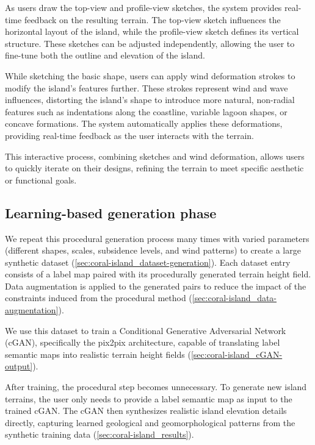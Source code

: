 As users draw the top-view and profile-view sketches, the system provides real-time feedback on the resulting terrain. The top-view sketch influences the horizontal layout of the island, while the profile-view sketch defines its vertical structure. These sketches can be adjusted independently, allowing the user to fine-tune both the outline and elevation of the island.

While sketching the basic shape, users can apply wind deformation strokes to modify the island's features further. These strokes represent wind and wave influences, distorting the island's shape to introduce more natural, non-radial features such as indentations along the coastline, variable lagoon shapes, or concave formations. The system automatically applies these deformations, providing real-time feedback as the user interacts with the terrain.

This interactive process, combining sketches and wind deformation, allows users to quickly iterate on their designs, refining the terrain to meet specific aesthetic or functional goals.



\subsection{Learning-based generation phase}
\label{sec:coral-island_cGAN-phase}

We repeat this procedural generation process many times with varied parameters (different shapes, scales, subsidence levels, and wind patterns) to create a large synthetic dataset (\cref{sec:coral-island_dataset-generation}). Each dataset entry consists of a label map paired with its procedurally generated terrain height field. Data augmentation is applied to the generated pairs to reduce the impact of the constraints induced from the procedural method (\cref{sec:coral-island_data-augmentation}).

We use this dataset to train a Conditional Generative Adversarial Network (cGAN), specifically the pix2pix architecture, capable of translating label semantic maps into realistic terrain height fields (\cref{sec:coral-island_cGAN-output}).

After training, the procedural step becomes unnecessary. To generate new island terrains, the user only needs to provide a label semantic map as input to the trained cGAN. The cGAN then synthesizes realistic island elevation details directly, capturing learned geological and geomorphological patterns from the synthetic training data (\cref{sec:coral-island_results}).


